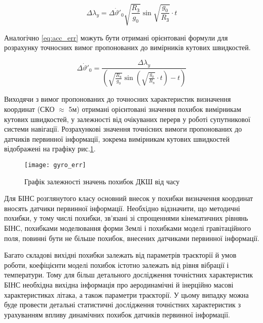 \[\Delta \lambda _{y} =\Delta \dot{\vartheta }'_{0} \sqrt{\frac{R_{\text{З}} }{g_{0} } } \sin \sqrt{\frac{g_{0} }{R_{\text{З}} } } \cdot t\] 


Аналогічно \eqref{eq:acc_err} можуть бути отримані орієнтовані формули для розрахунку точносних вимог 
пропонованих до вимірників кутових швидкостей.

\[\Delta \dot{\vartheta }'_{0} =\frac{\Delta \lambda _{y} }{\left(\sqrt{\frac{R_{{\text{З}}} }{g_{0} } } \sin \left(\sqrt{\frac{g_{0} }{R_{{\text{З}}} } } \cdot t\right)-t\right)} \] 

Виходячи з вимог пропонованих до точносних характеристик визначення координат (СКО $\approx$ 5м) 
отримані орієнтовані значення похибок вимірникам кутових швидкостей, у залежності від очікуваних 
перерв у роботі супутникової системи навігації. Розрахункові значення точнісних вимоги пропонованих 
до датчиків первинної інформації, зокрема вимірникам кутових швидкостей відображені на графіку рис.\ref{fig:gyro_err}.

\begin{figure}[here]
\centering
\texttt{[image: gyro\_err]}
\caption{Графік залежності значень похибок ДКШ від часу}
\label{fig:gyro_err}
\end{figure} 





Для БІНС розглянутого класу основний внесок у похибки визначення координат вносять датчики первинної 
інформації. Необхідно відзначити, що методичні похибки, у тому числі похибки, зв'язані зі спрощеннями 
кінематичних рівнянь БІНС, похибками моделювання форми Землі і похибками моделі гравітаційного поля, 
повинні бути не більше  похибок, внесених датчиками первинної інформації.

Багато складові вихідні похибки залежать від параметрів траєкторії й умов роботи, коефіцієнти моделі 
похибок істотно залежать від рівня вібрації і температури. Тому для більш детального дослідження 
точністних характеристик  БІНС необхідна вихідна інформація про аеродинамічні й інерційно масові 
характеристиках літака, а також параметри траєкторії. У цьому випадку можна буде провести детальні 
статистичні дослідження точністних характеристик з урахуванням впливу динамічних похибок датчиків первинної інформації.


